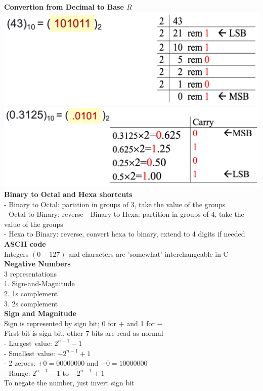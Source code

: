 \documentclass[10pt, a4paper]{article}
\begin{document}
\begin{multicols*}{3}
		\textbf{Convertion from Decimal to Base $R$}\\
		\includegraphics[scale=0.25]{./assets/baseConversion}\\
		\includegraphics[scale=0.25]{./assets/baseConversion2}\\
		
		\textbf{Binary to Octal and Hexa shortcuts}\\
		- Binary to Octal: partition in groups of 3, take the value of the groups\\
		- Octal to Binary: reverse
		- Binary to Hexa: partition in groups of 4, take the value of the groups\\
		- Hexa to Binary: reverse, convert hexa to binary, extend to 4 digits if needed\\
		
		\textbf{ASCII code}\\
		Integers $(0 - 127)$ and characters are 'somewhat' interchangeable in C\\
		
		\textbf{Negative Numbers}\\
		3 representations\\
		1. Sign-and-Magnitude\\
		2. 1s complement\\
		3. 2s complement\\
		
		\textbf{Sign and Magnitude}\\
		Sign is represented by sign bit; 0 for $+$ and 1 for $-$\\
		First bit is sign bit, other 7 bits are read as normal\\
		- Largest value: $2^{n - 1} - 1$\\
		- Smallest value: $-2^{n - 1} + 1$\\		
		- 2 zeroes: $+0 = 00000000$ and $-0 = 10000000$\\
		- Range: $2^{n - 1} - 1$ to $-2^{n - 1} + 1$\\
		To negate the number, just invert sign bit\\
		

\end{multicols*}
\end{document}
